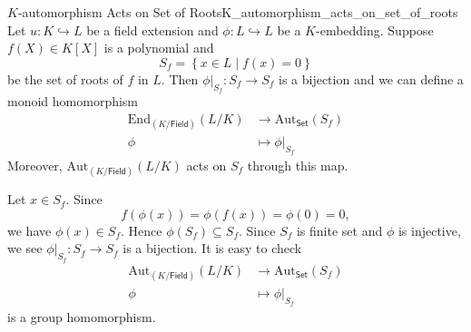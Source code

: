 \begin{proposition}{$K$-automorphism Acts on Set of Roots}{K_automorphism_acts_on_set_of_roots}
    Let $u:K\hookrightarrow L$ be a field extension and $\phi:L\hookrightarrow L$ be a $K$-embedding. Suppose $f(X)\in K[X]$ is a polynomial and 
    \[
    S_f = \left\{x\in L\mid f(x)=0\right\}
    \]
    be the set of roots of $f$ in $L$. Then $\phi|_{S_f}:S_f\to S_f$ is a bijection and we can define a monoid homomorphism
    \begin{align*}
        \mathrm{End}_{(K/\mathsf{Field})}(L/K)&\longrightarrow \mathrm{Aut}_{\mathsf{Set}}\left(S_f\right)\\
        \phi&\longmapsto \phi|_{S_f}
    \end{align*}
    Moreover, $\mathrm{Aut}_{(K/\mathsf{Field})}(L/K)$ acts on $S_f$ through this map.
\end{proposition}
\begin{prf}
    Let $x\in S_f$. Since
    \[
    f(\phi(x))=\phi(f(x))=\phi(0)=0,
    \]
    we have $\phi(x)\in S_f$. Hence $\phi(S_f)\subseteq S_f$. Since $S_f$ is finite set and $\phi$ is injective, we see $\phi|_{S_f}:S_f\to S_f$ is a bijection. It is easy to check
    \begin{align*}
        \mathrm{Aut}_{(K/\mathsf{Field})}(L/K)&\longrightarrow \mathrm{Aut}_{\mathsf{Set}}\left(S_f\right)\\
        \phi&\longmapsto \phi|_{S_f}
    \end{align*}
    is a group homomorphism. 

\end{prf}

